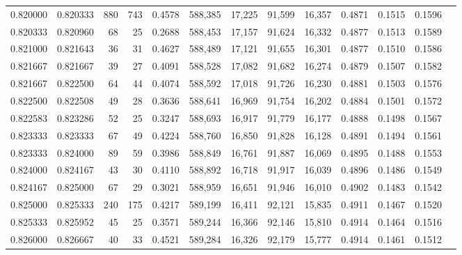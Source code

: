\begin{tabular}{rrrrrrrrrrrrr}
0.820000 & 0.820333 &   880 & 743 &                                     0.4578 & 588,385 &  17,225 &  91,599 &  16,357 & 0.4871 & 0.1515 & 0.1596 \\
0.820333 & 0.820960 &    68 &  25 &                                     0.2688 & 588,453 &  17,157 &  91,624 &  16,332 & 0.4877 & 0.1513 & 0.1589 \\
0.821000 & 0.821643 &    36 &  31 &                                     0.4627 & 588,489 &  17,121 &  91,655 &  16,301 & 0.4877 & 0.1510 & 0.1586 \\
0.821667 & 0.821667 &    39 &  27 &                                     0.4091 & 588,528 &  17,082 &  91,682 &  16,274 & 0.4879 & 0.1507 & 0.1582 \\
0.821667 & 0.822500 &    64 &  44 &                                     0.4074 & 588,592 &  17,018 &  91,726 &  16,230 & 0.4881 & 0.1503 & 0.1576 \\
0.822500 & 0.822508 &    49 &  28 &                                     0.3636 & 588,641 &  16,969 &  91,754 &  16,202 & 0.4884 & 0.1501 & 0.1572 \\
0.822583 & 0.823286 &    52 &  25 &                                     0.3247 & 588,693 &  16,917 &  91,779 &  16,177 & 0.4888 & 0.1498 & 0.1567 \\
0.823333 & 0.823333 &    67 &  49 &                                     0.4224 & 588,760 &  16,850 &  91,828 &  16,128 & 0.4891 & 0.1494 & 0.1561 \\
0.823333 & 0.824000 &    89 &  59 &                                     0.3986 & 588,849 &  16,761 &  91,887 &  16,069 & 0.4895 & 0.1488 & 0.1553 \\
0.824000 & 0.824167 &    43 &  30 &                                     0.4110 & 588,892 &  16,718 &  91,917 &  16,039 & 0.4896 & 0.1486 & 0.1549 \\
0.824167 & 0.825000 &    67 &  29 &                                     0.3021 & 588,959 &  16,651 &  91,946 &  16,010 & 0.4902 & 0.1483 & 0.1542 \\
0.825000 & 0.825333 &   240 & 175 &                                     0.4217 & 589,199 &  16,411 &  92,121 &  15,835 & 0.4911 & 0.1467 & 0.1520 \\
0.825333 & 0.825952 &    45 &  25 &                                     0.3571 & 589,244 &  16,366 &  92,146 &  15,810 & 0.4914 & 0.1464 & 0.1516 \\
0.826000 & 0.826667 &    40 &  33 &                                     0.4521 & 589,284 &  16,326 &  92,179 &  15,777 & 0.4914 & 0.1461 & 0.1512 \\

\end{tabular}
